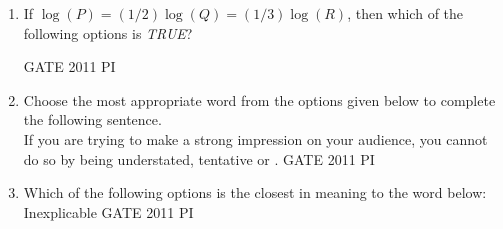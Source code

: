 \documentclass[journal,12pt,onecolumn]{IEEEtran}
\theoremstyle{remark}
\begin{document}
\begin{enumerate}
\item If $\log(P) = (1/2)\log(Q) = (1/3)\log(R)$, then which of the following options is \textit{TRUE}?

\hfill{GATE 2011 PI}
\begin{enumerate}
\end{enumerate}

\item Choose the most appropriate word from the options given below to complete the following sentence.\\
If you are trying to make a strong impression on your audience, you cannot do so by being understated, tentative or \underline{\hspace{2.2cm}}.
\hfill{GATE 2011 PI}
\begin{enumerate}
\end{enumerate}

\item Which of the following options is the closest in meaning to the word below: \\
Inexplicable
\hfill{GATE 2011 PI}
\begin{enumerate}
\end{enumerate}


\end{enumerate}
\end{document}
